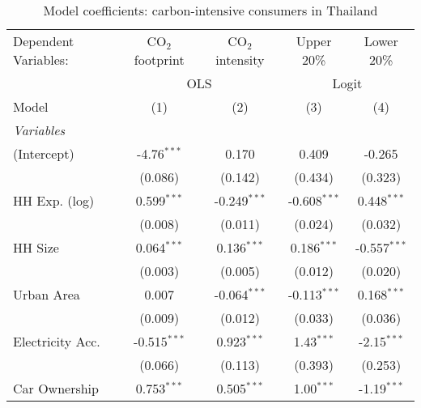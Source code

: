 
\begin{table}[htbp!]
   \centering
   \small
   \begin{adjustbox}{width = 1\textwidth, max height = 0.95\textheight, center}
      \begin{threeparttable}[b]
         \caption{\label{tab:Logit_1_THA} Model coefficients: carbon-intensive consumers in Thailand}
         \begin{tabular}{lcccc}
            \tabularnewline \midrule \midrule
            Dependent Variables: & CO$_{2}$ footprint & CO$_{2}$ intensity & Upper 20\%     & Lower 20\%\\   
             & \multicolumn{2}{c}{OLS} & \multicolumn{2}{c}{Logit} \\ 
            Model                & (1)                & (2)                & (3)            & (4)\\  
            \midrule
            \emph{Variables}\\
            (Intercept)          & -4.76$^{***}$      & 0.170              & 0.409          & -0.265\\   
                                 & (0.086)            & (0.142)            & (0.434)        & (0.323)\\   
            HH Exp. (log)        & 0.599$^{***}$      & -0.249$^{***}$     & -0.608$^{***}$ & 0.448$^{***}$\\   
                                 & (0.008)            & (0.011)            & (0.024)        & (0.032)\\   
            HH Size              & 0.064$^{***}$      & 0.136$^{***}$      & 0.186$^{***}$  & -0.557$^{***}$\\   
                                 & (0.003)            & (0.005)            & (0.012)        & (0.020)\\   
            Urban Area           & 0.007              & -0.064$^{***}$     & -0.113$^{***}$ & 0.168$^{***}$\\   
                                 & (0.009)            & (0.012)            & (0.033)        & (0.036)\\   
            Electricity Acc.     & -0.515$^{***}$     & 0.923$^{***}$      & 1.43$^{***}$   & -2.15$^{***}$\\   
                                 & (0.066)            & (0.113)            & (0.393)        & (0.253)\\   
            Car Ownership        & 0.753$^{***}$      & 0.505$^{***}$      & 1.00$^{***}$   & -1.19$^{***}$\\   

\end{tabular}
\end{threeparttable}
\end{adjustbox}
\end{table}
